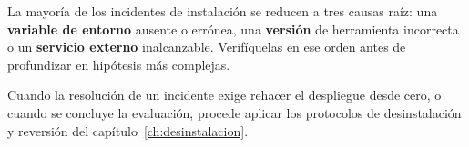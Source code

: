 \begin{AvisoNota}
La mayoría de los incidentes de instalación se reducen a tres causas raíz: una
\textbf{variable de entorno} ausente o errónea, una \textbf{versión} de herramienta
incorrecta o un \textbf{servicio externo} inalcanzable. Verifíquelas en ese orden antes de
profundizar en hipótesis más complejas.
\end{AvisoNota}

\par\vspace{0.2cm}
Cuando la resolución de un incidente exige rehacer el despliegue desde cero, o cuando se
concluye la evaluación, procede aplicar los protocolos de desinstalación y reversión del
capítulo~\ref{ch:desinstalacion}.\par
